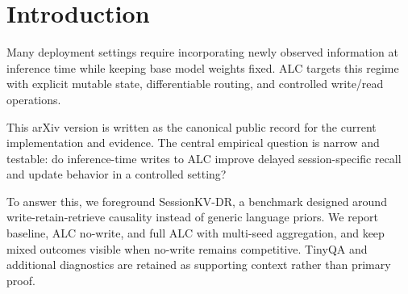 \section{Introduction}
Many deployment settings require incorporating newly observed information at inference time while keeping base model weights fixed. ALC targets this regime with explicit mutable state, differentiable routing, and controlled write/read operations.

This arXiv version is written as the canonical public record for the current implementation and evidence. The central empirical question is narrow and testable: do inference-time writes to ALC improve delayed session-specific recall and update behavior in a controlled setting?

To answer this, we foreground SessionKV-DR, a benchmark designed around write-retain-retrieve causality instead of generic language priors. We report baseline, ALC no-write, and full ALC with multi-seed aggregation, and keep mixed outcomes visible when no-write remains competitive. TinyQA and additional diagnostics are retained as supporting context rather than primary proof.
